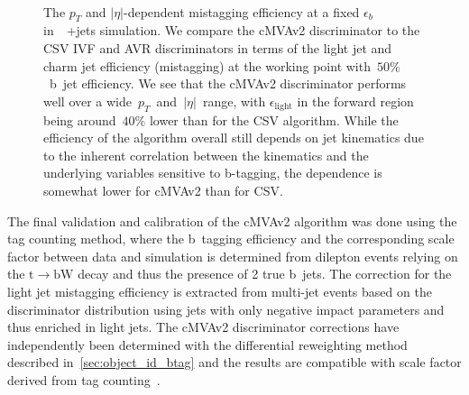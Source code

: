 \begin{figure}
\begin{centering}
 \\
\caption[The cMVAv2 mistagging probability as a function of jet kinematics.]{The $p_T$ and $|\eta|$-dependent mistagging efficiency at a fixed $\epsilon_{b}$ in~\ttbar~+jets simulation. We compare the cMVAv2 discriminator to the CSV IVF and AVR discriminators in terms of the light jet and charm jet efficiency (mistagging) at the working point with~$50\%$~b~jet efficiency. We see that the cMVAv2 discriminator performs well over a wide~$p_T$~and~$|\eta|$~range, with $\epsilon_{\mathrm{light}}$ in the forward region being around~$40\%$ lower than for the CSV algorithm. While the efficiency of the algorithm overall still depends on jet kinematics due to the inherent correlation between the kinematics and the underlying variables sensitive to b-tagging, the dependence is somewhat lower for cMVAv2 than for CSV.}
\label{fig:btag_kinematics}
\end{centering}
\end{figure}

The final validation and calibration of the cMVAv2 algorithm was done using the tag counting method, where the b~tagging efficiency and the corresponding scale factor between data and simulation is determined from dilepton events relying on the $\mathrm{t} \rightarrow \mathrm{b} \mathrm{W}$ decay and thus the presence of 2 true b~jets. The correction for the light jet mistagging efficiency is extracted from multi-jet events based on the discriminator distribution using jets with only negative impact parameters and thus enriched in light jets. The cMVAv2 discriminator corrections have independently been determined with the differential reweighting method described in~\cref{sec:object_id_btag} and the results are compatible with scale factor derived from tag counting~\cite{CMS-PAS-BTV-15-001}. 

